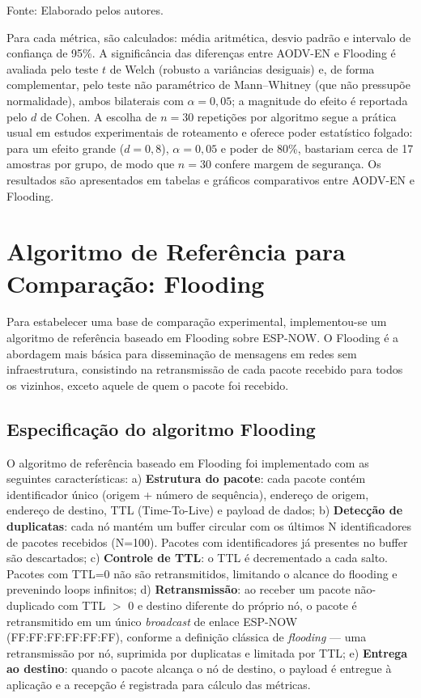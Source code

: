 Fonte: Elaborado pelos autores.

Para cada métrica, são calculados: média aritmética, desvio padrão e
intervalo de confiança de 95\%. A significância das diferenças entre
AODV-EN e Flooding é avaliada pelo teste $t$ de Welch (robusto a
variâncias desiguais) e, de forma complementar, pelo teste não
paramétrico de Mann--Whitney (que não pressupõe normalidade), ambos
bilaterais com $\alpha = 0{,}05$; a magnitude do efeito é reportada pelo
$d$ de Cohen. A escolha de $n = 30$ repetições por algoritmo segue a
prática usual em estudos experimentais de roteamento e oferece poder
estatístico folgado: para um efeito grande ($d = 0{,}8$), $\alpha = 0{,}05$
e poder de 80\%, bastariam cerca de 17 amostras por grupo, de modo que
$n = 30$ confere margem de segurança. Os resultados são apresentados em
tabelas e gráficos comparativos entre AODV-EN e Flooding.

\section{Algoritmo de Referência para Comparação:
Flooding}\label{algoritmo-de-referuxeancia-para-comparauxe7uxe3o-flooding}

Para estabelecer uma base de comparação experimental, implementou-se
um algoritmo de referência baseado em Flooding sobre ESP-NOW. O Flooding
é a abordagem mais básica para disseminação de mensagens em redes sem
infraestrutura, consistindo na retransmissão de cada pacote recebido
para todos os vizinhos, exceto aquele de quem o pacote foi recebido.

\subsection{Especificação do algoritmo
Flooding}\label{especificauxe7uxe3o-do-algoritmo-flooding}

O algoritmo de referência baseado em Flooding foi implementado com as
seguintes características: a) \textbf{Estrutura do pacote}: cada pacote
contém identificador único (origem + número de sequência), endereço de
origem, endereço de destino, TTL (Time-To-Live) e payload de dados; b)
\textbf{Detecção de duplicatas}: cada nó mantém um buffer circular com
os últimos N identificadores de pacotes recebidos (N=100). Pacotes com
identificadores já presentes no buffer são descartados; c)
\textbf{Controle de TTL}: o TTL é decrementado a cada salto. Pacotes com
TTL=0 não são retransmitidos, limitando o alcance do flooding e
prevenindo loops infinitos; d) \textbf{Retransmissão}: ao receber um
pacote não-duplicado com TTL $>$ 0 e destino diferente do próprio
nó, o pacote é retransmitido em um único \emph{broadcast} de enlace
ESP-NOW (FF:FF:FF:FF:FF:FF), conforme a definição clássica de
\emph{flooding} --- uma retransmissão por nó, suprimida por duplicatas e
limitada por TTL; e) \textbf{Entrega ao destino}: quando o pacote
alcança o nó de destino, o payload é entregue à aplicação e a recepção é
registrada para cálculo das métricas.

